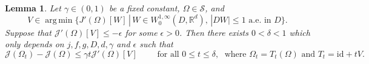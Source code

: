 \documentclass[a4paper,10pt]{article}
\theoremstyle{plain}
\newtheorem{lemma}[thm]{Lemma}
\theoremstyle{plain}
\numberwithin{equation}{section}
\DeclareMathOperator*{\argmin}{arg\,min}
\begin{document}
\begin{lemma} \label{decrease}
 Let {$\gamma \in (0,1)$ be a fixed constant,} $\Omega \in \mathcal S$, and
\begin{displaymath}
V \in \argmin \lbrace J'(\Omega)[W] \, | \, W \in W^{1,\infty}_0(D, \mathbb R^d), \, | DW | \leq 1 \mbox{ a.e. in } D \rbrace.
\end{displaymath}
Suppose that $\mathcal J'(\Omega)[V] \leq - \epsilon$ for some $\epsilon>0$. Then there exists 
$0< \delta <1$ which only depends on $j, f, g, D, d, \gamma$ and $\epsilon$ such that
\begin{displaymath}
\mathcal J(\Omega_{t}) - \mathcal J(\Omega) \leq \gamma t \mathcal J'(\Omega)[V] \qquad \mbox{ for all } 0 \leq t \leq \delta, \; \mbox{ where } \Omega_{t} = T_t(\Omega) \mbox{ and } T_t=\mbox{id}+ t V.
\end{displaymath}
\end{lemma}
\end{document}

